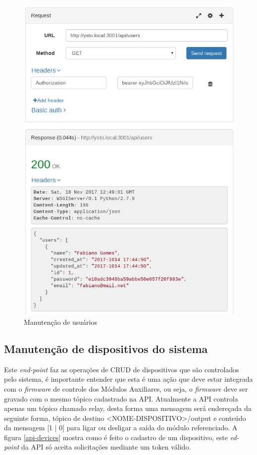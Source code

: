 \begin{figure}[H]
\caption{\label{api-users} Manutenção de usuários}
\includegraphics[scale=0.35]{img/07-api-users.png}
\end{figure}

\subsection{Manutenção de dispositivos do sistema}
Este \textit{end-point} faz as operações de CRUD de dispositivos que são controlados pelo sistema, é importante entender que esta é uma ação que deve estar integrada com o \textit{firmware} de controle dos Módulos Auxiliares, ou seja, o \textit{firmware} deve ser gravado com o mesmo tópico cadastrado na API. Atualmente a API controla apenas um tópico chamado relay, desta forma uma mensagem será endereçada da seguinte forma, tópico de destino <NOME-DISPOSITIVO>/output e conteúdo da mensagem [1 | 0] para ligar ou desligar a saída do módulo referenciado. A figura \ref{api-devices} mostra como é feito o cadastro de um dispositivo, este \textit{ed-point} da API só aceita solicitações mediante um token válido.

